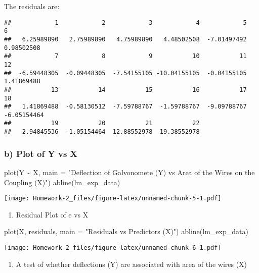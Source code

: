 \documentclass[
]{article}
\newenvironment{Shaded}{\begin{snugshade}}{\end{snugshade}}
\newcommand{\AttributeTok}[1]{\textcolor[rgb]{0.77,0.63,0.00}{#1}}
\newcommand{\FunctionTok}[1]{\textcolor[rgb]{0.00,0.00,0.00}{#1}}
\newcommand{\NormalTok}[1]{#1}
\newcommand{\SpecialCharTok}[1]{\textcolor[rgb]{0.00,0.00,0.00}{#1}}
\newcommand{\StringTok}[1]{\textcolor[rgb]{0.31,0.60,0.02}{#1}}
\providecommand{\tightlist}{%
  \setlength{\itemsep}{0pt}\setlength{\parskip}{0pt}}
\begin{document}
The residuals are:

\begin{verbatim}
##            1            2            3            4            5            6 
##   6.25989890   2.75989890   4.75989890   4.48502508  -7.01497492   0.98502508 
##            7            8            9           10           11           12 
##  -6.59448305  -0.09448305  -7.54155105 -10.04155105  -0.04155105   1.41869488 
##           13           14           15           16           17           18 
##   1.41869488  -0.58130512  -7.59788767  -1.59788767  -9.09788767  -6.05154464 
##           19           20           21           22 
##   2.94845536  -1.05154464  12.88552978  19.38552978
\end{verbatim}

\hypertarget{b-plot-of-y-vs-x}{%
\subsubsection{b) Plot of Y vs X}\label{b-plot-of-y-vs-x}}

\begin{Shaded}
\begin{Highlighting}[]
\FunctionTok{plot}\NormalTok{(Y }\SpecialCharTok{\textasciitilde{}}\NormalTok{ X, }\AttributeTok{main =} \StringTok{"Deflection of Galvonomete (Y) vs Area of the Wires on the Coupling (X)"}\NormalTok{)}
\FunctionTok{abline}\NormalTok{(lm\_exp\_data)}
\end{Highlighting}
\end{Shaded}

\texttt{[image: Homework-2\_files/figure-latex/unnamed-chunk-5-1.pdf]}

\begin{enumerate}
\def\labelenumi{\alph{enumi})}
\setcounter{enumi}{2}
\tightlist
\item
  Residual Plot of e vs X
\end{enumerate}

\begin{Shaded}
\begin{Highlighting}[]
\FunctionTok{plot}\NormalTok{(X, residuals, }\AttributeTok{main =} \StringTok{"Residuals vs Predictors (X)"}\NormalTok{)}
\FunctionTok{abline}\NormalTok{(lm\_exp\_data)}
\end{Highlighting}
\end{Shaded}

\texttt{[image: Homework-2\_files/figure-latex/unnamed-chunk-6-1.pdf]}

\begin{enumerate}
\def\labelenumi{\alph{enumi})}
\setcounter{enumi}{3}
\tightlist
\item
  A test of whether deflections (Y) are associated with area of the
  wires (X)
\end{enumerate}
\end{document}
